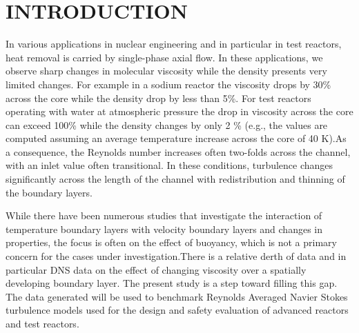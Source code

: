 \documentclass[twocolumn,10pt]{asme2e}
\begin{document}
\section*{INTRODUCTION}
In various applications in nuclear engineering and in particular in test reactors, heat removal is carried by single-phase axial flow. In these applications, we observe sharp changes in molecular viscosity while the density presents very limited changes.  For example in a sodium reactor the viscosity drops by 30\% across the core \cite{finkthermodynamic} while the density drop by less than 5\%.  For test reactors operating with water at atmospheric pressure the drop in viscosity across the core can exceed 100\% while the density changes by only 2 \% (e.g., the values are computed assuming an average temperature increase across the core of 40 K).As a consequence, the Reynolds number increases often two-folds across the channel, with an inlet value often transitional.  In these conditions, turbulence changes significantly across the length of the channel with redistribution and thinning of the boundary layers.

While there have been numerous studies that investigate the interaction of temperature boundary layers with velocity boundary layers and changes in properties, the focus is often on the effect of buoyancy, which is not a primary concern for the cases under investigation.There is a relative derth of data and in particular DNS data on the effect of changing viscosity over a spatially developing boundary layer. The present study is a step toward filling this  gap. The data generated will be used to benchmark Reynolds Averaged Navier Stokes turbulence models used for the design and safety evaluation of advanced reactors and test reactors.
\end{document}
